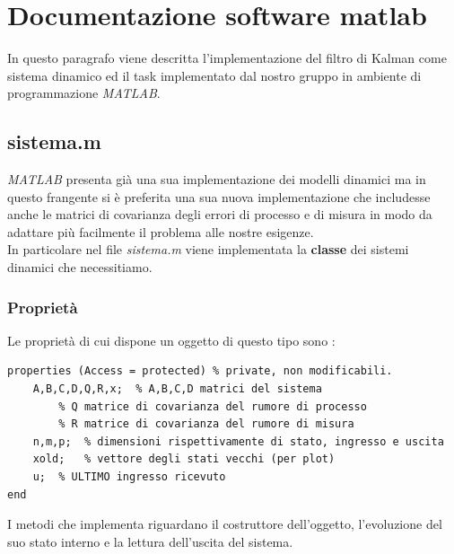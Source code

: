 \section{Documentazione software matlab}
In questo paragrafo viene descritta l'implementazione del filtro di Kalman come sistema dinamico ed il task implementato dal nostro gruppo in ambiente di programmazione \textit{MATLAB}.
\subsection{sistema.m}
\textit{MATLAB} presenta già una sua implementazione dei modelli dinamici ma in questo frangente si è preferita una sua nuova implementazione che includesse anche le matrici di covarianza degli errori di processo e di misura in modo da adattare più facilmente il problema alle nostre esigenze.\\
In particolare nel file \textit{sistema.m} viene implementata la \textbf{classe} dei sistemi dinamici che necessitiamo.\\
\subsubsection{Proprietà}
Le proprietà di cui dispone un oggetto di questo tipo sono :
\begin{lstlisting}[frame=single]
properties (Access = protected) % private, non modificabili.
	A,B,C,D,Q,R,x;	% A,B,C,D matrici del sistema
		% Q matrice di covarianza del rumore di processo
		% R matrice di covarianza del rumore di misura
	n,m,p;	% dimensioni rispettivamente di stato, ingresso e uscita
	xold;	% vettore degli stati vecchi (per plot)
	u;	% ULTIMO ingresso ricevuto
end
\end{lstlisting}

I metodi che implementa riguardano il costruttore dell'oggetto, l'evoluzione del suo stato interno e la lettura dell'uscita del sistema.\\
\newpage
